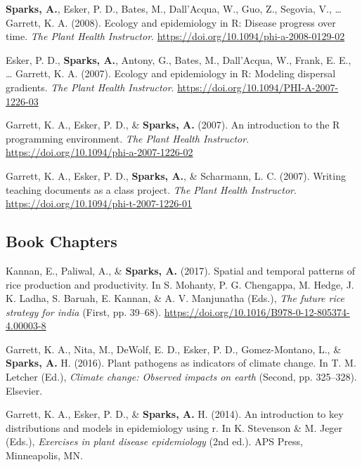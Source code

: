\documentclass[11pt, a4paper]{awesome-cv}
\begin{document}
\leavevmode\hypertarget{ref-Sparks2008}{}%
\textbf{Sparks, A.}, Esker, P. D., Bates, M., Dall'Acqua, W., Guo, Z., Segovia, V., \ldots{} Garrett, K. A. (2008). Ecology and epidemiology in R: Disease progress over time. \emph{The Plant Health Instructor}. \url{https://doi.org/10.1094/phi-a-2008-0129-02}

\leavevmode\hypertarget{ref-Esker2007}{}%
Esker, P. D., \textbf{Sparks, A.}, Antony, G., Bates, M., Dall'Acqua, W., Frank, E. E., \ldots{} Garrett, K. A. (2007). Ecology and epidemiology in R: Modeling dispersal gradients. \emph{The Plant Health Instructor}. \url{https://doi.org/10.1094/PHI-A-2007-1226-03}

\leavevmode\hypertarget{ref-Garrett2007}{}%
Garrett, K. A., Esker, P. D., \& \textbf{Sparks, A.} (2007). An introduction to the R programming environment. \emph{The Plant Health Instructor}. \url{https://doi.org/10.1094/phi-a-2007-1226-02}

\leavevmode\hypertarget{ref-Garrett2007a}{}%
Garrett, K. A., Esker, P. D., \textbf{Sparks, A.}, \& Scharmann, L. C. (2007). Writing teaching documents as a class project. \emph{The Plant Health Instructor}. \url{https://doi.org/10.1094/phi-t-2007-1226-01}

\endgroup

\hypertarget{book-chapters}{%
\subsection{Book Chapters}\label{book-chapters}}

\begingroup
\setlength{\parindent}{-0.5in}
\setlength{\leftskip}{0.5in}

\hypertarget{refs_books}{}
\leavevmode\hypertarget{ref-Kannan2017}{}%
Kannan, E., Paliwal, A., \& \textbf{Sparks, A.} (2017). Spatial and temporal patterns of rice production and productivity. In S. Mohanty, P. G. Chengappa, M. Hedge, J. K. Ladha, S. Baruah, E. Kannan, \& A. V. Manjunatha (Eds.), \emph{The future rice strategy for india} (First, pp. 39--68). \url{https://doi.org/10.1016/B978-0-12-805374-4.00003-8}

\leavevmode\hypertarget{ref-Garrett2016}{}%
Garrett, K. A., Nita, M., DeWolf, E. D., Esker, P. D., Gomez-Montano, L., \& \textbf{Sparks, A.} H. (2016). Plant pathogens as indicators of climate change. In T. M. Letcher (Ed.), \emph{Climate change: Observed impacts on earth} (Second, pp. 325--328). Elsevier.

\leavevmode\hypertarget{ref-Garrett2014}{}%
Garrett, K. A., Esker, P. D., \& \textbf{Sparks, A.} H. (2014). An introduction to key distributions and models in epidemiology using r. In K. Stevenson \& M. Jeger (Eds.), \emph{Exercises in plant disease epidemiology} (2nd ed.). APS Press, Minneapolis, MN.
\end{document}
